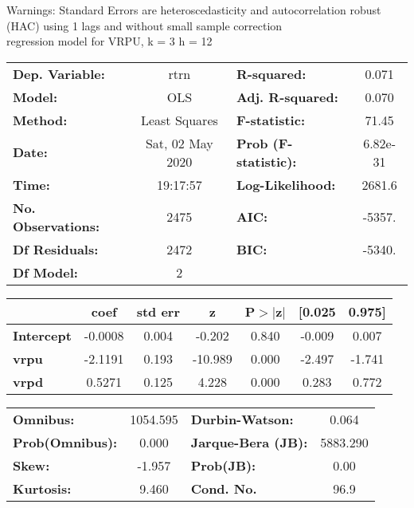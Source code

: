 Warnings: \newline
 [1] Standard Errors are heteroscedasticity and autocorrelation robust (HAC) using 1 lags and without small sample correction\\ 

regression model for VRPU, k = 3 h = 12\begin{center}
\begin{tabular}{lclc}
\toprule
\textbf{Dep. Variable:}    &       rtrn       & \textbf{  R-squared:         } &     0.071   \\
\textbf{Model:}            &       OLS        & \textbf{  Adj. R-squared:    } &     0.070   \\
\textbf{Method:}           &  Least Squares   & \textbf{  F-statistic:       } &     71.45   \\
\textbf{Date:}             & Sat, 02 May 2020 & \textbf{  Prob (F-statistic):} &  6.82e-31   \\
\textbf{Time:}             &     19:17:57     & \textbf{  Log-Likelihood:    } &    2681.6   \\
\textbf{No. Observations:} &        2475      & \textbf{  AIC:               } &    -5357.   \\
\textbf{Df Residuals:}     &        2472      & \textbf{  BIC:               } &    -5340.   \\
\textbf{Df Model:}         &           2      & \textbf{                     } &             \\
\bottomrule
\end{tabular}
\begin{tabular}{lcccccc}
                   & \textbf{coef} & \textbf{std err} & \textbf{z} & \textbf{P$> |$z$|$} & \textbf{[0.025} & \textbf{0.975]}  \\
\midrule
\textbf{Intercept} &      -0.0008  &        0.004     &    -0.202  &         0.840        &       -0.009    &        0.007     \\
\textbf{vrpu}      &      -2.1191  &        0.193     &   -10.989  &         0.000        &       -2.497    &       -1.741     \\
\textbf{vrpd}      &       0.5271  &        0.125     &     4.228  &         0.000        &        0.283    &        0.772     \\
\bottomrule
\end{tabular}
\begin{tabular}{lclc}
\textbf{Omnibus:}       & 1054.595 & \textbf{  Durbin-Watson:     } &    0.064  \\
\textbf{Prob(Omnibus):} &   0.000  & \textbf{  Jarque-Bera (JB):  } & 5883.290  \\
\textbf{Skew:}          &  -1.957  & \textbf{  Prob(JB):          } &     0.00  \\
\textbf{Kurtosis:}      &   9.460  & \textbf{  Cond. No.          } &     96.9  \\
\bottomrule
\end{tabular}
\end{center}

